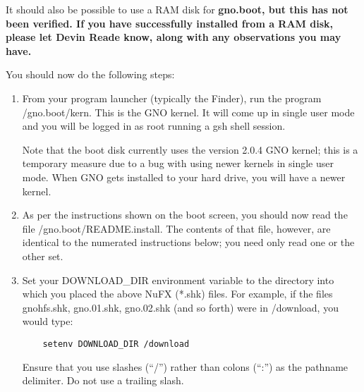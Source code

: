 \documentclass{report}
\begin{document}
It should also be possible to use a RAM disk for \bf gno.boot\rm, but
this has not been verified.  If you have successfully installed from a
RAM disk, please let Devin Reade know, along with any observations
you may have.

You should now do the following steps:

\begin{comment}

If your volumes are named something else, replace the names in the cd commands
below with the appropriate name.
 
\end{comment}


\begin{enumerate}


\item
From your program launcher (typically the Finder), run the program
/gno.boot/kern.
This is the GNO kernel.  It will come up in 
single user mode and you will be logged in as root running a 
gsh
shell session.

Note that the boot disk currently uses the version 2.0.4 GNO kernel; this
is a temporary measure due to a bug with using newer kernels in single user
mode.  When GNO gets installed to your hard drive, you will have a newer
kernel.

\item
As per the instructions shown on the boot screen, you should now read the
file /gno.boot/README.install.  The contents of that file, however, are
identical to the numerated instructions below; you need only read one or
the other set.

\item
Set your DOWNLOAD\_DIR environment variable to the directory
into which you placed the above NuFX (*.shk) files. For example,
if the files gnohfs.shk, gno.01.shk, gno.02.shk (and so forth)
were in /download, you would type:

\begin{verbatim}
	setenv DOWNLOAD_DIR /download
\end{verbatim}

Ensure that you use slashes (``/'') rather than colons (``:'') as the
pathname delimiter.  Do not use a trailing slash.


\end{enumerate}
\end{document}
